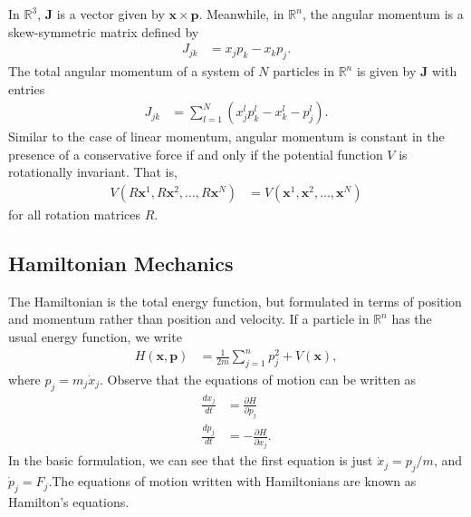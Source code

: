 \documentclass[10pt]{extarticle}
\newcommand{\R}{\mathbb{R}}
\theoremstyle{plain}
\theoremstyle{definition}
\theoremstyle{remark}
\begin{document}
  In $\R^3$, $\mathbf{J}$ is a vector given by $\mathbf{x}\times \mathbf{p}$. Meanwhile, in $\R^n$, the angular momentum is a skew-symmetric matrix defined by
  \begin{align*}
    J_{jk} &= x_{j}p_k - x_kp_j.
  \end{align*}
  The total angular momentum of a system of $N$ particles in $\R^n$ is given by $\mathbf{J}$ with entries
  \begin{align*}
    J_{jk} &= \sum_{l=1}^{N}\left(x_{j}^lp_{k}^l - x_{k}^l - p_{j}^l\right).
  \end{align*}
  Similar to the case of linear momentum, angular momentum is constant in the presence of a conservative force if and only if the potential function $V$ is rotationally invariant. That is,
  \begin{align*}
    V(R\mathbf{x}^1,R\mathbf{x}^2,\dots,R\mathbf{x}^N) &= V(\mathbf{x}^1,\mathbf{x}^2,\dots,\mathbf{x}^N)
  \end{align*}
  for all rotation matrices $R$.
  \subsection{Hamiltonian Mechanics}%
  The Hamiltonian is the total energy function, but formulated in terms of position and momentum rather than position and velocity. If a particle in $\R^n$ has the usual energy function, we write
  \begin{align*}
    H(\mathbf{x},\mathbf{p}) &= \frac{1}{2m}\sum_{j=1}^{n}p_j^2 + V(\mathbf{x}),
  \end{align*}
  where $p_j = m_j\dot{x}_j$. Observe that the equations of motion can be written as
  \begin{align*}
    \frac{dx_j}{dt} &= \frac{\partial H}{\partial p_j}\\
    \frac{dp_j}{dt} &= -\frac{\partial H}{\partial x_j}.
  \end{align*}
  In the basic formulation, we can see that the first equation is just $\dot{x}_j = p_j/m$, and $\dot{p}_j = F_j$.The equations of motion written with Hamiltonians are known as Hamilton's equations.
\end{document}
